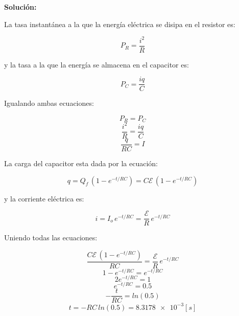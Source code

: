 \documentclass[letter,11pt]{article}
\begin{document}
\begin{enumerate}
\textbf{Solución:}

La tasa instantánea a la que la energía eléctrica se disipa en el resistor es:

\begin{equation*}
    P_R = \frac{i^2}{R}
\end{equation*}

y la tasa a la que la energía se almacena en el capacitor es:

\begin{equation*}
    P_C = \frac{iq}{C}
\end{equation*}

Igualando ambas ecuaciones:

\begin{equation*}
    P_R = P_C
\end{equation*}
\begin{equation*}
    \frac{i^2}{R} = \frac{iq}{C}
\end{equation*}
\begin{equation*}
    \frac{q}{RC} = I
\end{equation*}

La carga del capacitor esta dada por la ecuación:

\begin{equation*}
    q = Q_f\,(1-e^{-t/RC}) = C\mathcal{E}\,(1-e^{-t/RC})
\end{equation*}

y la corriente eléctrica es:

\begin{equation*}
    i = I_o\,e^{-t/RC} = \frac{\mathcal{E}}{R}\,e^{-t/RC}
\end{equation*}

Uniendo todas las ecuaciones:

\begin{equation*}
    \dfrac{C\mathcal{E}\,(1-e^{-t/RC})}{RC} = \frac{\mathcal{E}}{R}\,e^{-t/RC}
\end{equation*}
\begin{equation*}
    1-e^{-t/RC} = e^{-t/RC}
\end{equation*}
\begin{equation*}
    2e^{-t/RC} = 1
\end{equation*}
\begin{equation*}
    e^{-t/RC} = 0.5
\end{equation*}
\begin{equation*}
    -\frac{t}{RC} = ln(0.5)
\end{equation*}
\begin{equation*}
    t = -RC\,ln(0.5) = \num{8.3178e-3} [s]
\end{equation*}

\end{enumerate}
\end{document}
